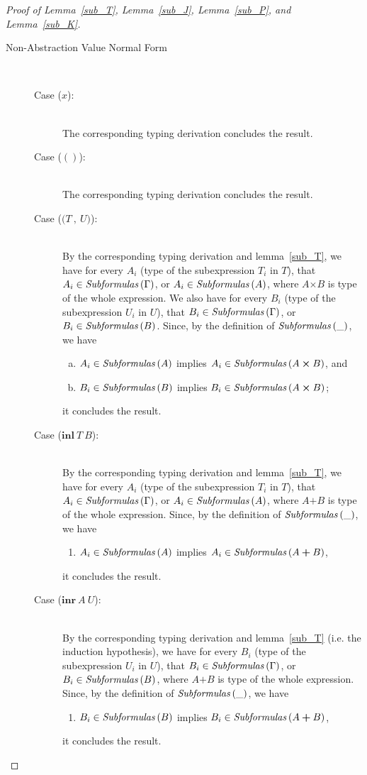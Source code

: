 \documentclass[a4paper]{article}
\newcommand{\typprd}[2]{#1\boldsymbol{\times}#2}
\newcommand{\typsum}[2]{#1\boldsymbol{+}#2}
\newcommand{\expvar}[1]{#1}
\newcommand{\expunt}{\boldsymbol{()}}
\newcommand{\expprd}[2]{\boldsymbol{(}#1\ \boldsymbol{,}\ #2\boldsymbol{)}}
\newcommand{\explft}[2]{\mathbf{inl}\ #1\ #2}
\newcommand{\exprgt}[2]{\mathbf{inr}\ #1\ #2}
\newcommand{\txt}[1]{\text{\textit{#1}}}
\newcommand{\subformulas}[1]{\txt{Subformulas}\,(#1)}
\begin{document}
\begin{proof}[Proof of Lemma~\ref{sub_T}, Lemma~\ref{sub_J}, Lemma~\ref{sub_P}, and Lemma~\ref{sub_K}]
\begin{description}
\item[Non-Abstraction Value Normal Form]\ \\
\begin{description}
\item[Case ($\expvar{x}$):]\ \\ 
  The corresponding typing derivation concludes the result. 
\item[Case ($\expunt$):]\ \\ 
  The corresponding typing derivation concludes the result. 
\item[Case ($\expprd{T}{U}$):]\ \\ 
  By the corresponding typing derivation and lemma~\ref{sub_T}, we
  have for every $A_i$ (type of the subexpression $T_i$ in $T$), that
  $A_i \in \subformulas{\Gamma}$, or $A_i \in \subformulas{A}$, where
  $\typprd{A}{B}$ is type of the whole expression. We also have for
  every $B_i$ (type of the subexpression $U_i$ in $U$), that $B_i \in
  \subformulas{\Gamma}$, or $B_i \in \subformulas{B}$. Since, by the
  definition of $\subformulas{\_}$, we have
  \begin{enumerate}[(a)] 
     \item $A_i \in \subformulas{A}$ implies $A_i \in \subformulas{\typprd{A}{B}}$, and
     \item $B_i \in \subformulas{B}$ implies $B_i \in \subformulas{\typprd{A}{B}}$;
  \end{enumerate}
  it concludes the result.
\item[Case ($\explft{T}{B}$):]\ \\
  By the corresponding typing derivation and lemma~\ref{sub_T}, we
  have for every $A_i$ (type of the subexpression $T_i$ in $T$), that
  $A_i \in \subformulas{\Gamma}$, or $A_i \in \subformulas{A}$, where
  $\typsum{A}{B}$ is type of the whole expression.  Since, by the
  definition of $\subformulas{\_}$, we have
  \begin{enumerate}[] 
     \item $A_i \in \subformulas{A}$ implies $A_i \in \subformulas{\typsum{A}{B}}$,
  \end{enumerate}
  it concludes the result. 
\item[Case ($\exprgt{A}{U}$):]\ \\
  By the corresponding typing derivation and lemma~\ref{sub_T}
  (i.e. the induction hypothesis), we have for every $B_i$ (type of
  the subexpression $U_i$ in $U$), that $B_i \in
  \subformulas{\Gamma}$, or $B_i \in \subformulas{B}$,
  where $\typsum{A}{B}$ is type of the whole expression.
  Since, by the definition of $\subformulas{\_}$, we have
  \begin{enumerate}[] 
     \item $B_i \in \subformulas{B}$ implies $B_i \in \subformulas{\typsum{A}{B}}$,
  \end{enumerate}
  it concludes the result.
\end{description}


\end{description}
\end{proof}
\end{document}
